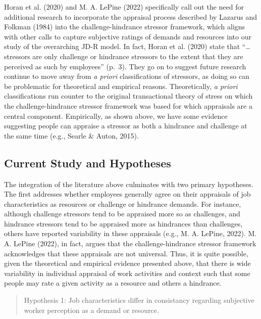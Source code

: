 \documentclass[
  man,mask]{apa6}
\begin{document}
Horan et al. (2020) and M. A. LePine (2022) specifically call out the need for additional research to incorporate the appraisal process described by Lazarus and Folkman (1984) into the challenge-hindrance stressor framework, which aligns with other calls to capture subjective ratings of demands and resources into our study of the overarching JD-R model. In fact, Horan et al. (2020) state that ``\ldots stressors are only challenge or hindrance stressors to the extent that they are perceived as such by employees'' (p.~3). They go on to suggest future research continue to move away from \emph{a priori} classifications of stressors, as doing so can be problematic for theoretical and empirical reasons. Theoretically, \emph{a priori} classifications run counter to the original transactional theory of stress on which the challenge-hindrance stressor framework was based for which appraisals are a central component. Empirically, as shown above, we have some evidence suggesting people can appraise a stressor as both a hindrance and challenge at the same time (e.g., Searle \& Auton, 2015).

\hypertarget{current-study-and-hypotheses}{%
\subsection{Current Study and Hypotheses}\label{current-study-and-hypotheses}}

The integration of the literature above culminates with two primary hypotheses. The first addresses whether employees generally agree on their appraisals of job characteristics as resources or challenge or hindrance demands. For instance, although challenge stressors tend to be appraised more so as challenges, and hindrance stressors tend to be appraised more as hindrances than challenges, others have reported variability in these appraisals (e.g., M. A. LePine, 2022). M. A. LePine (2022), in fact, argues that the challenge-hindrance stressor framework acknowledges that these appraisals are not universal. Thus, it is quite possible, given the theoretical and empirical evidence presented above, that there is wide variability in individual appraisal of work activities and context such that some people may rate a given activity as a resource and others a hindrance.

\begin{quote}
Hypothesis 1: Job characteristics differ in consistancy regarding subjective worker perception as a demand or resource.
\end{quote}
\end{document}
